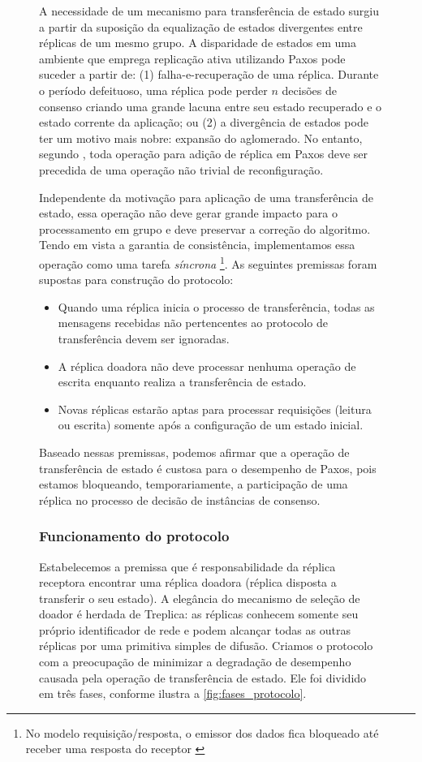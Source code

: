 \begin{figure}[ht]
A necessidade de um mecanismo para transferência de estado surgiu a partir da suposição da
equalização de estados divergentes entre réplicas de um mesmo grupo. A disparidade de
estados em uma ambiente que emprega replicação ativa utilizando Paxos pode suceder a
partir de: (1) falha-e-recuperação de uma réplica. Durante o período defeituoso, uma
réplica pode perder $n$ decisões de consenso criando uma grande lacuna entre seu estado
recuperado e o estado corrente da aplicação; ou (2) a divergência de estados pode ter um
motivo mais nobre: expansão do aglomerado. No entanto, segundo ,
toda operação para adição de réplica em Paxos deve ser precedida de uma operação não
trivial de reconfiguração.

Independente da motivação para aplicação de uma transferência de estado, essa operação
não deve gerar grande impacto para o processamento em grupo e deve preservar a correção do
algoritmo. Tendo em vista a garantia de consistência, implementamos essa operação como uma
tarefa \emph{síncrona} \footnote{No modelo requisição/resposta, o emissor dos dados fica
bloqueado até receber uma resposta do receptor \cite{coulouris11}}. As seguintes premissas
foram supostas para construção do protocolo:

\begin{itemize}
  \item Quando uma réplica inicia o processo de transferência, todas as mensagens
    recebidas não pertencentes ao protocolo de transferência devem ser ignoradas.
  \item A réplica doadora não deve processar nenhuma operação de escrita enquanto realiza
    a transferência de estado.
  \item Novas réplicas estarão aptas para processar requisições (leitura ou escrita)
    somente após a configuração de um estado inicial.
\end{itemize}

Baseado nessas premissas, podemos afirmar que a operação de transferência de estado é
custosa para o desempenho de Paxos, pois estamos bloqueando, temporariamente, a
participação de uma réplica no processo de decisão de instâncias de consenso.

\subsubsection{Funcionamento do protocolo}

Estabelecemos a premissa que é responsabilidade da réplica receptora encontrar uma réplica
doadora (réplica disposta a transferir o seu estado). A elegância do mecanismo de seleção
de doador é herdada de Treplica: as réplicas conhecem somente seu próprio identificador de
rede e podem alcançar todas as outras réplicas por uma primitiva simples de difusão.
Criamos o protocolo com a preocupação de minimizar a degradação de desempenho causada pela
operação de transferência de estado. Ele foi dividido em três fases, conforme ilustra a
\autoref{fig:fases_protocolo}.


\end{figure}
